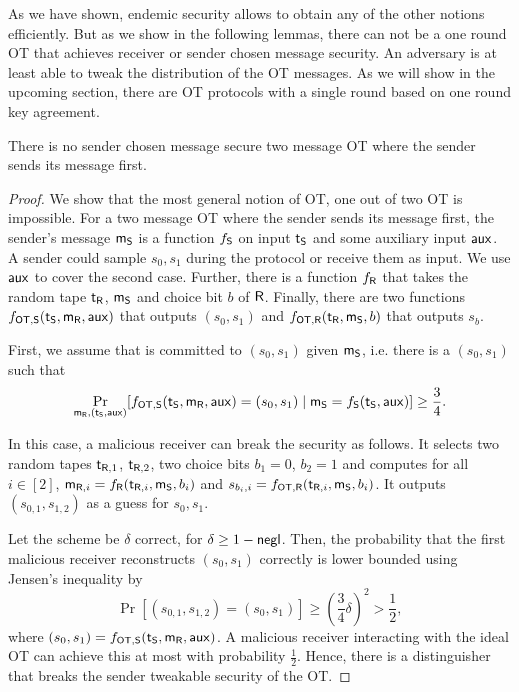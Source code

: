 As we have shown, endemic security allows to obtain any of the other notions efficiently. But as we show in the following lemmas, there can not be a one round OT that achieves receiver or sender chosen message security. An adversary is at least able to tweak the distribution of the OT messages. As we will show in the upcoming section, there are OT protocols with a single round based on one round key agreement.


\begin{lemma}\label{lem:nosendtweak}
There is no sender chosen message secure two message OT where the sender sends its message first. 
\end{lemma}



\begin{proof}
We show that the most general notion of OT, one out of two OT is impossible.  
For a two message OT where the sender sends its message first, the sender's message $\mathsf{m}_{\mathsf{S}}$ is a function $f_{\mathsf{S}}$ on input $\mathsf{t}_{\mathsf{S}}$ and some auxiliary input $\mathsf{aux}$. A sender could sample $s_0,s_1$ during the protocol or receive them as input. We use $\mathsf{aux}$ to cover the second case. Further, there is a function $f_{\mathsf{R}}$ that takes the random tape $\mathsf{t}_{\mathsf{R}}$, $\mathsf{m}_{\mathsf{S}}$ and choice bit $b$ of $\mathsf{R}$. Finally, there are two functions $f_{\mathsf{OT},\mathsf{S}}(\mathsf{t}_{\mathsf{S}},\mathsf{m}_{\mathsf{R}},\mathsf{aux})$ that outputs $(s_0,s_1)$ and $f_{\mathsf{OT},\mathsf{R}}(\mathsf{t}_{\mathsf{R}},\mathsf{m}_{\mathsf{S}},b)$ that outputs $s_b$. 

First, we assume that \send is committed to $(s_0,s_1)$ given $\mathsf{m}_{\mathsf{S}}$, i.e. there is a $(s_0,s_1)$ such that
$$
\Pr_{\mathsf{m}_{\mathsf{R}}, (\mathsf{t}_{\mathsf{S}},\mathsf{aux})}[f_{\mathsf{OT},\mathsf{S}}(\mathsf{t}_{\mathsf{S}},\mathsf{m}_{\mathsf{R}},\mathsf{aux})=(s_0,s_1)\mid \mathsf{m}_{\mathsf{S}}=f_{\mathsf{S}}(\mathsf{t}_{\mathsf{S}},\mathsf{aux})]\geq\frac{3}{4}.
$$

In this case, a malicious receiver can break the security as follows. It selects two random tapes $\mathsf{t}_{\mathsf{R},1}$, $\mathsf{t}_{\mathsf{R},2}$, two choice bits $b_1=0$, $b_2=1$ and computes for all $i\in[2]$, $\mathsf{m}_{\mathsf{R},i}= f_{\mathsf{R}}(\mathsf{t}_{\mathsf{R},i},\mathsf{m}_{\mathsf{S}},b_i)$ and $s_{b_{i},i}=f_{\mathsf{OT},\mathsf{R}}(\mathsf{t}_{\mathsf{R},i},\mathsf{m}_{\mathsf{S}},b_i)$. It outputs $(s_{0,1},s_{1,2})$ as a guess for $s_0,s_1$.

Let the scheme be $\delta$ correct, for $\delta\geq 1-\mathsf{negl}$. Then, the probability that the first malicious receiver reconstructs $(s_0,s_1)$ correctly is lower bounded using Jensen's inequality by
$$
\Pr[(s_{0,1},s_{1,2})=(s_0,s_1)]\geq \left(\frac{3}{4}\delta\right)^2> \frac{1}{2},
$$
where $(s_0,s_1)=f_{\mathsf{OT},\mathsf{S}}(\mathsf{t}_{\mathsf{S}},\mathsf{m}_{\mathsf{R}},\mathsf{aux})$. A malicious receiver interacting with the ideal OT can achieve this at most with probability $\frac{1}{2}$. Hence, there is a distinguisher that breaks the sender tweakable security of the OT.


\end{proof}
